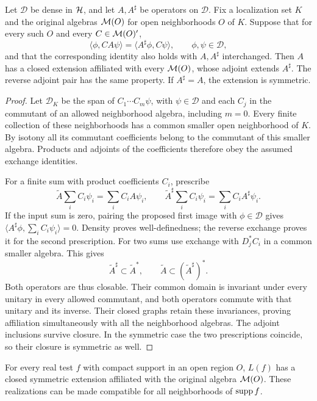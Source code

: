 \begin{lemma}\label{R:commutant-extension}
Let $\mathcal D$ be dense in $\mathcal H$, and let $A,A^\sharp$ be operators
on $\mathcal D$.  Fix a localization set $K$ and the original
algebras $\mathcal M(O)$ for open neighborhoods $O$ of $K$.  Suppose that
for every such $O$ and every $C\in\mathcal M(O)'$,
\[
 \langle\phi,CA\psi\rangle
 =\langle A^\sharp\phi,C\psi\rangle,
 \qquad\phi,\psi\in\mathcal D,
\]
and that the corresponding identity also holds with $A,A^\sharp$
interchanged.  Then $A$ has a closed extension affiliated with every
$\mathcal M(O)$, whose adjoint extends $A^\sharp$.  The reverse adjoint
pair has the same property.  If $A^\sharp=A$, the extension is
symmetric.
\end{lemma}

\begin{proof}
Let $\mathcal D_K$ be the span of $C_1\cdots C_m\psi$, with
$\psi\in\mathcal D$ and each $C_j$ in the commutant of an allowed
neighborhood algebra, including $m=0$.  Every finite collection of
these neighborhoods has a common smaller open neighborhood of $K$.
By isotony all its commutant coefficients belong to the commutant
of this smaller algebra.  Products and adjoints of the coefficients
therefore obey the assumed exchange identities.

For a finite sum with product coefficients $C_i$, prescribe
\[
 \widetilde A\sum_iC_i\psi_i=\sum_iC_iA\psi_i,
 \qquad
 \widetilde A^\sharp\sum_iC_i\psi_i=\sum_iC_iA^\sharp\psi_i.
\]
If the input sum is zero, pairing the proposed first image with
$\phi\in\mathcal D$ gives
$\langle A^\sharp\phi,\sum_i C_i\psi_i\rangle=0$.
Density proves well-definedness; the reverse exchange proves it
for the second prescription.  For two sums use exchange with
$D_j^*C_i$ in a common smaller algebra.  This gives
\[
 \widetilde A^\sharp\subset\widetilde A^*,\qquad
 \widetilde A\subset(\widetilde A^\sharp)^*.
\]
Both operators are thus closable.  Their common domain is invariant
under every unitary in every allowed commutant, and both operators
commute with that unitary and its inverse.  Their closed graphs retain
these invariances, proving affiliation simultaneously with all the
neighborhood algebras.  The adjoint inclusions survive closure.  In
the symmetric case the two prescriptions coincide, so their closure
is symmetric as well.
\end{proof}

\begin{proposition}\label{R:affiliation}
For every real test $f$ with compact support in an open region $O$,
$L(f)$ has a closed symmetric extension affiliated with the original
algebra $\mathcal M(O)$.  These realizations can be made
compatible for all neighborhoods of $\operatorname{supp} f$.
\end{proposition}

